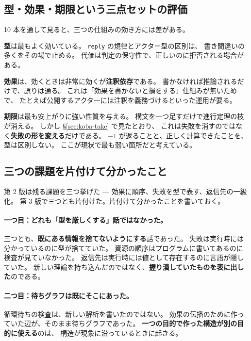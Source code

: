 \documentclass[11pt,a4paper]{ltjsarticle}
\theoremstyle{definition}
\theoremstyle{remark}
\begin{document}
\subsection{型・効果・期限という三点セットの評価}

10 本を通して見ると、三つの仕組みの効き方には差がある。

\textbf{型}は最もよく効いている。
\texttt{reply} の規律とアクター型の区別は、
書き間違いの多くをその場で止める。
代価は判定の保守性で、正しいのに拒否される場合がある。

\textbf{効果}は、効くときは非常に効くが\textbf{注釈依存}である。
書かなければ推論されるだけで、誤りは通る。
これは「効果を書かないと損をする」仕組みが無いためで、
たとえば公開するアクターには注釈を義務づけるといった運用が要る。

\textbf{期限}は最も安上がりに強い性質を与える。
構文を一つ足すだけで進行定理の枝が消える。
しかし \S\ref{sec:koba-take} で見たとおり、
これは失敗を消すのではなく\textbf{失敗の形を変える}だけである。
$-1$ が返ることと、正しく計算できたことを、型は区別しない。
ここが現状で最も弱い箇所だと考えている。

\subsection{三つの課題を片付けて分かったこと}

第 2 版は残る課題を三つ挙げた --- 効果に順序、失敗を型で表す、返信先の一級化。
第 3 版で三つとも片付けた。片付けて分かったことを書いておく。

\paragraph{一つ目：どれも「型を厳しくする」話ではなかった。}
三つとも、\textbf{既にある情報を捨てないようにする}話であった。
失敗は実行時には分かっているのに型が捨てていた。
資源の順序はプログラムに書いてあるのに検査が見ていなかった。
返信先は実行時には値として存在するのに言語が隠していた。
新しい理論を持ち込んだのではなく、\textbf{握り潰していたものを表に出した}のである。

\paragraph{二つ目：待ちグラフは既にそこにあった。}
循環待ちの検査は、新しい解析を書いたのではない。
効果の伝播のために作っていた辺が、そのまま待ちグラフであった。
\textbf{一つの目的で作った構造が別の目的に使える}のは、
構造が現象に沿っているときに起きる。
\end{document}
